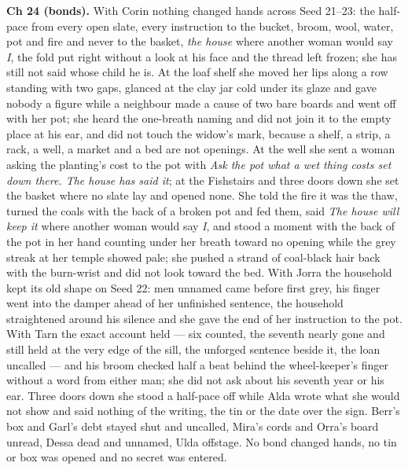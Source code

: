 \documentclass{design/chronicle}
\begin{document}
{\textbf{Ch 24 (bonds).} With Corin nothing changed hands across Seed 21–23: the half-pace from every open slate, every instruction to the bucket, broom, wool, water, pot and fire and never to the basket, \emph{the house} where another woman would say \emph{I}, the fold put right without a look at his face and the thread left frozen; she has still not said whose child he is. At the loaf shelf she moved her lips along a row standing with two gaps, glanced at the clay jar cold under its glaze and gave nobody a figure while a neighbour made a cause of two bare boards and went off with her pot; she heard the one-breath naming and did not join it to the empty place at his ear, and did not touch the widow’s mark, because a shelf, a strip, a rack, a well, a market and a bed are not openings. At the well she sent a woman asking the planting’s cost to the pot with \emph{Ask the pot what a wet thing costs set down there. The house has said it}; at the Fishstairs and three doors down she set the basket where no slate lay and opened none. She told the fire it was the thaw, turned the coals with the back of a broken pot and fed them, said \emph{The house will keep it} where another woman would say \emph{I}, and stood a moment with the back of the pot in her hand counting under her breath toward no opening while the grey streak at her temple showed pale; she pushed a strand of coal-black hair back with the burn-wrist and did not look toward the bed. With Jorra the household kept its old shape on Seed 22: men unnamed came before first grey, his finger went into the damper ahead of her unfinished sentence, the household straightened around his silence and she gave the end of her instruction to the pot. With Tarn the exact account held — six counted, the seventh nearly gone and still held at the very edge of the sill, the unforged sentence beside it, the loan uncalled — and his broom checked half a beat behind the wheel-keeper’s finger without a word from either man; she did not ask about his seventh year or his ear. Three doors down she stood a half-pace off while Alda wrote what she would not show and said nothing of the writing, the tin or the date over the sign. Berr’s box and Garl’s debt stayed shut and uncalled, Mira’s cords and Orra’s board unread, Dessa dead and unnamed, Ulda offstage. No bond changed hands, no tin or box was opened and no secret was entered.

}
\end{document}
